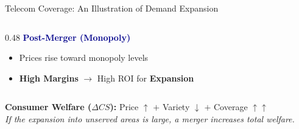\documentclass[10pt, aspectratio=169]{beamer}
\newcommand{\pos}[1]{\textcolor{softgreen}{#1}}
\newcommand{\negg}[1]{\textcolor{softred}{#1}}
\begin{document}
\begin{frame}{Telecom Coverage: An Illustration of Demand Expansion}
\begin{columns}[T,onlytextwidth]
    \begin{column}{0.48\textwidth}
        \textbf{\textcolor{darkblue}{Post-Merger (Monopoly)}}
        \vspace{-0.05cm} %
        \begin{itemize}
            \item[\tiny$\bullet$] Prices rise toward monopoly levels
            \item[\tiny$\bullet$] \textbf{High Margins} $\rightarrow$ High ROI for \textbf{Expansion}
        \end{itemize}
    \end{column}
\end{columns}

\vspace{0.6cm}

\centering
\begin{minipage}{0.9\textwidth}
    \centering
    \textbf{Consumer Welfare ($\Delta CS$):} 
    \negg{Price $\uparrow$} $+$ \negg{Variety $\downarrow$} $+$ \pos{Coverage $\uparrow\uparrow$} \\
    \vspace{0.2em}
    \textit{\footnotesize If the expansion into unserved areas is large, a merger increases total welfare.}
\end{minipage}

\end{frame}
\end{document}
